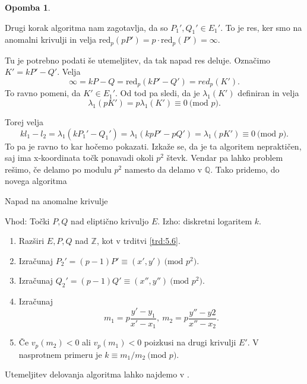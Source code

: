 \documentclass[12pt,a4paper,twoside]{article}
\theoremstyle{definition} %
\newtheorem{opomba}[definicija]{Opomba}
\theoremstyle{plain} %
\numberwithin{equation}{section}  %
\newcommand{\Z}{\mathbb Z}
\newcommand{\Q}{\mathbb Q}
\newcommand{\MOD}[1]{\ \text{(mod }{#1}\text{)}}
\begin{document}
\begin{opomba}~

Drugi korak algoritma nam zagotavlja, da so $P_1',Q_1' \in E_1'$. To je res, ker smo na anomalni krivulji in velja $\text{red}_p(pP') = p\cdot \text{red}_p(P') = \infty$.
\end{opomba}

Tu je potrebno podati še utemeljitev, da tak napad res deluje. Označimo $K' = kP'-Q'$.
Velja
$$\infty = kP-Q = \text{red}_p(kP'-Q') = red_p(K').$$
To ravno pomeni, da $K' \in E_1'$. Od tod pa sledi, da je $\lambda_1(K')$ definiran in velja
$$\lambda_1(pK') = p \lambda_1(K') \equiv 0 \MOD{p}.$$

Torej velja
$$kl_1-l_2 = \lambda_1(kP_1'-Q_1') = \lambda_1(kpP'-pQ') = \lambda_1(pK') \equiv 0 \MOD{p}.$$
To pa je ravno to kar hočemo pokazati.
Izkaže se, da je ta algoritem nepraktičen, saj ima x-koordinata točk ponavadi okoli $p^2$ števk.
Vendar pa lahko problem rešimo, če delamo po modulu $p^2$ namesto da delamo v $\Q$.
Tako pridemo, do novega algoritma

\begin{algorithm}[H]
\caption[ANC]{Napad na anomalne krivulje}
\label{alg:AnomalAttack}
Vhod: Točki $P, Q$ nad eliptično krivuljo $E$.\newline
Izho: diskretni logaritem $k$.\newline
\begin{enumerate}
\item Razširi $E,P,Q$ nad $\Z$, kot v trditvi \ref{trd:5.6}.
\item Izračunaj $P_2' = (p-1)P' \equiv (x',y') \MOD{p^2}$.
\item Izračunaj $Q_2' = (p-1)Q' \equiv(x'',y'') \MOD{p^2}$.
\item Izračunaj
$$m_1 = p\frac{y'-y_1}{x'-x_1}, \ m_2 = p\frac{y''-y2}{x''-x_2}.$$
\item Če $v_p(m_2) <0$ ali $v_p(m_1)<0$ poizkusi na drugi krivulji $E'$. V nasprotnem primeru je $k \equiv m_1/m_2 \MOD{p}$.
\end{enumerate}

\end{algorithm}

Utemeljitev delovanja algoritma lahko najdemo v \cite{Washington2008}.
\end{document}
